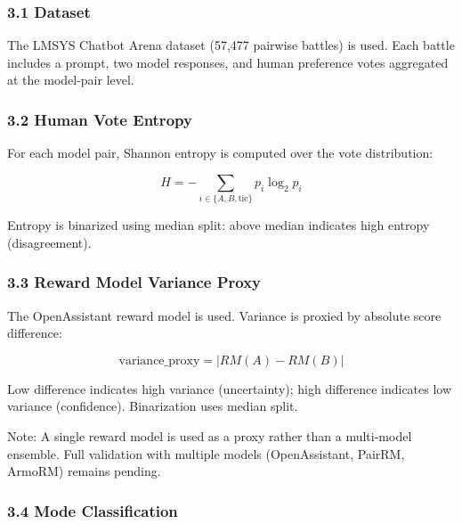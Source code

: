 
\subsubsection{3.1 Dataset}

The LMSYS Chatbot Arena dataset (57,477 pairwise battles) is used. Each battle includes a prompt, two model responses, and human preference votes aggregated at the model-pair level.

\subsubsection{3.2 Human Vote Entropy}

For each model pair, Shannon entropy is computed over the vote distribution:

$$H = -\sum_{i \in \{A, B, \text{tie}\}} p_i \log_2 p_i$$

Entropy is binarized using median split: above median indicates high entropy (disagreement).

\subsubsection{3.3 Reward Model Variance Proxy}

The OpenAssistant reward model is used. Variance is proxied by absolute score difference:

$$\text{variance\_proxy} = |RM(A) - RM(B)|$$

Low difference indicates high variance (uncertainty); high difference indicates low variance (confidence). Binarization uses median split.

Note: A single reward model is used as a proxy rather than a multi-model ensemble. Full validation with multiple models (OpenAssistant, PairRM, ArmoRM) remains pending.

\subsubsection{3.4 Mode Classification}

\begin{table}[htbp]
\centering
{}
\end{table}

